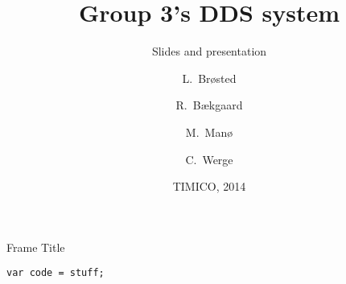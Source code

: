 \documentclass[compressed, presentation,notheorems]{beamer}
\title{Group 3's DDS system}
\subtitle{Slides and presentation}
\author[Author, Anders] %
{L.~Brøsted \and R.~Bækgaard \and M.~Manø \and C.~Werge}
\institute
{
  Aarhus University \\
  School of Engineering
}
\date{TIMICO, 2014}
\begin{document}
  \frame{\titlepage}
	\begin{frame}[fragile]{Frame Title}
	\begin{lstlisting}[caption=Overskrift på boks, style=Code-C++, label=lst:referenceLabel]
	var code = stuff;
	\end{lstlisting}
	\end{frame}
\end{document}
